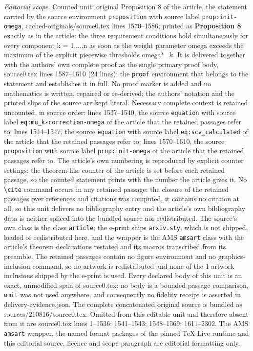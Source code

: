 \documentclass[10pt,a4paper]{amsart}
\begin{document}
\noindent\textit{Editorial scope.} Counted unit: original Proposition 8 of the article, the statement carried by the source environment \texttt{proposition} with source label \texttt{prop:init-omega}, cached-originals/source0.tex lines 1570--1586, printed as \textbf{Proposition 8} exactly as in the article: the three requirement conditions hold simultaneously for every component k = 1,...,n as soon as the weight parameter omega exceeds the maximum of the explicit piecewise thresholds omega*\_k. It is delivered together with the authors' own complete proof as the single primary proof body, source0.tex lines 1587--1610 (24 lines): the \texttt{proof} environment that belongs to the statement and establishes it in full. No proof marker is added and no mathematics is written, repaired or re-derived; the authors' notation and the printed slips of the source are kept literal. Necessary complete context is retained uncounted, in source order: lines 1537--1540, the source \texttt{equation} with source label \texttt{eq:mu\_k-correction-omega} of the article that the retained passages refer to; lines 1544--1547, the source \texttt{equation} with source label \texttt{eq:scv\_calculated} of the article that the retained passages refer to; lines 1570--1610, the source \texttt{proposition} with source label \texttt{prop:init-omega} of the article that the retained passages refer to. The article's own numbering is reproduced by explicit counter settings: the theorem-like counter of the article is set before each retained passage, so the counted statement prints with the number the article gives it. No \texttt{\textbackslash cite} command occurs in any retained passage: the closure of the retained passages over references and citations was computed, it contains no citation at all, so this unit delivers no bibliography entry and the article's own bibliography data is neither spliced into the bundled source nor redistributed. The source's own class is the class \texttt{article}; the e-print ships \texttt{arxiv.sty}, which is not shipped, loaded or redistributed here, and the wrapper is the AMS \texttt{amsart} class with the article's theorem declarations restated and its macros transcribed from its preamble. The retained passages contain no figure environment and no graphics-inclusion command, so no artwork is redistributed and none of the 1 artwork inclusions shipped by the e-print is used. Every declared body of this unit is an exact, unmodified span of source0.tex: no body is a bounded passage comparison, \texttt{omit} was not used anywhere, and consequently no fidelity receipt is asserted in delivery-evidence.json. The complete concatenated original source is bundled as sources/210816/source0.tex. Omitted from this editable unit and therefore absent from it are source0.tex lines 1--1536; 1541--1543; 1548--1569; 1611--2302. The AMS \texttt{amsart} wrapper, the named format packages of the pinned TeX Live runtime and this editorial source, licence and scope paragraph are editorial formatting only.\par\smallskip
\end{document}
